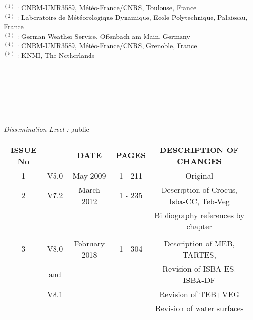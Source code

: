 \documentclass[11pt]{book}
\begin{document}
{{$^{(1)}$ : CNRM-UMR3589, M\'et\'eo-France/CNRS, Toulouse, France \\ 
$^{(2)}$ : Laboratoire de M\'et\'eorologique Dynamique, Ecole Polytechnique, Palaiseau, France \\ 
$^{(3)}$ : German Weather Service, Offenbach am Main, Germany  \\ 
$^{(4)}$ : CNRM-UMR3589, M\'et\'eo-France/CNRS, Grenoble, France \\ 
$^{(5)}$ : KNMI, The Netherlands

~\\ \\ \\ \\ \\ \\ 

{\it{Dissemination Level :}} public


}}

\newpage
\begin{tabular}{|c|c|c|c|c|}
\hline
ISSUE No       &   &      DATE           &      PAGES      &         DESCRIPTION OF CHANGES                       \\
\hline
   1           & V5.0  &      May 2009       &      1 - 211    &         Original                                 \\
\hline
   2           & V7.2  &      March 2012     &      1 - 235    &         Description of Crocus, Isba-CC, Teb-Veg  \\
               &       &                     &                 &         Bibliography references by chapter       \\
               &       &                     &                 &                                                  \\
\hline
   3           & V8.0  &      February 2018  &      1 - 304    &         Description of MEB, TARTES,              \\
               & and   &                     &                 &         Revision of ISBA-ES, ISBA-DF             \\
               & V8.1  &                     &                 &         Revision of TEB+VEG                      \\
               &       &                     &                 &         Revision of water surfaces               \\
\hline
\end{tabular}
\newpage
\dominitoc
\tableofcontents
\end{document}
